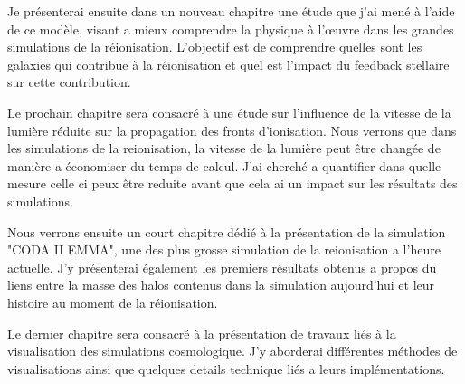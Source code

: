 


Je présenterai ensuite dans un nouveau chapitre une étude que j'ai mené à l'aide de ce modèle, visant a mieux comprendre la physique à l'œuvre dans les grandes simulations de la réionisation.
L'objectif est de comprendre quelles sont les galaxies qui contribue à la réionisation et quel est l'impact du feedback stellaire sur cette contribution.

Le prochain chapitre sera consacré à une étude sur l'influence de la vitesse de la lumière réduite sur la propagation des fronts d'ionisation.
Nous verrons que dans les simulations de la reionisation, la vitesse de la lumière peut être changée de manière a économiser du temps de calcul.
J'ai cherché a quantifier dans quelle mesure celle ci peux être reduite avant que cela ai un impact sur les résultats des simulations.

Nous verrons ensuite un court chapitre dédié à la présentation de la simulation "CODA II EMMA", une des plus grosse simulation de la reionisation a l'heure actuelle.
J'y présenterai également les premiers résultats obtenus a propos du liens entre la masse des halos contenus dans la simulation aujourd'hui et leur histoire au moment de la réionisation.




Le dernier chapitre sera consacré à la présentation de travaux liés à la visualisation des simulations cosmologique.
J'y aborderai différentes méthodes de visualisations ainsi que quelques details technique liés a leurs implémentations.

